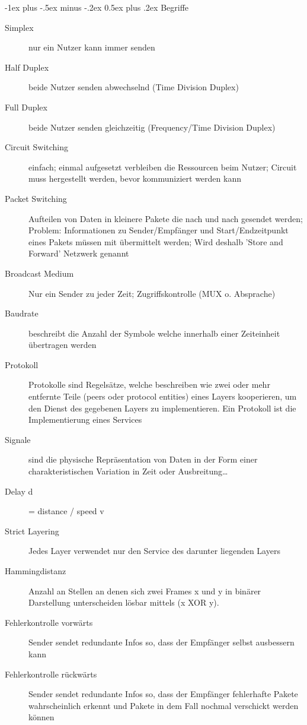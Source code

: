 \documentclass[10pt,landscape]{article}
\makeatletter
\renewcommand{\section}{\@startsection{section}{1}{0mm}%
                                {-1ex plus -.5ex minus -.2ex}%
                                {0.5ex plus .2ex}%
                                {\normalfont\large\bfseries}}
\makeatother
\begin{document}
\begin{multicols}{3}
\newpage
\section{Begriffe}
\begin{description}
    \item[Simplex] nur ein Nutzer kann immer senden
    \item[Half Duplex] beide Nutzer senden abwechselnd (Time Division Duplex)
    \item[Full Duplex] beide Nutzer senden gleichzeitig (Frequency/Time Division Duplex)
    \item[Circuit Switching] einfach; einmal aufgesetzt verbleiben die Ressourcen beim Nutzer; Circuit muss hergestellt werden, bevor kommuniziert werden kann
    \item[Packet Switching] Aufteilen von Daten in kleinere Pakete die nach und nach gesendet werden; Problem: Informationen zu Sender/Empfänger und Start/Endzeitpunkt eines Pakets müssen mit übermittelt werden; Wird deshalb 'Store and Forward' Netzwerk genannt
    \item[Broadcast Medium] Nur ein Sender zu jeder Zeit; Zugriffskontrolle (MUX o. Absprache)
    \item[Baudrate] beschreibt die Anzahl der Symbole welche innerhalb einer Zeiteinheit übertragen werden
    \item[Protokoll] Protokolle sind Regelsätze, welche beschreiben wie zwei oder mehr entfernte Teile (peers oder protocol entities) eines Layers kooperieren, um den Dienst des gegebenen Layers zu implementieren. Ein Protokoll ist die Implementierung eines Services
    \item[Signale] sind die physische Repräsentation von Daten in der Form einer charakteristischen Variation in Zeit oder Ausbreitung…
    \item[Delay d] = distance / speed v
    \item[Strict Layering] Jedes Layer verwendet nur den Service des darunter liegenden Layers
    \item[Hammingdistanz] Anzahl an Stellen an denen sich zwei Frames x und y in binärer Darstellung unterscheiden lösbar mittels (x XOR y). 
    \item[Fehlerkontrolle vorwärts] Sender sendet redundante Infos so, dass der Empfänger selbst ausbessern kann
    \item[Fehlerkontrolle rückwärts] Sender sendet redundante Infos so, dass der Empfänger fehlerhafte Pakete wahrscheinlich erkennt und Pakete in dem Fall nochmal verschickt werden können

\end{description}
\end{multicols}
\end{document}
